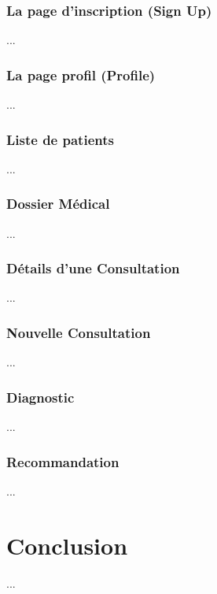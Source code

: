         \subsubsection{La page d'inscription (Sign Up)}
        ...

        \subsubsection{La page profil (Profile)}
        ...

        \subsubsection{Liste de patients}
        ...

        \subsubsection{Dossier Médical}
        ...

        \subsubsection{Détails d'une Consultation}
        ...

        \subsubsection{Nouvelle Consultation}
        ...

        \subsubsection{Diagnostic}
        ...

        \subsubsection{Recommandation}
        ...

\section*{Conclusion}
...